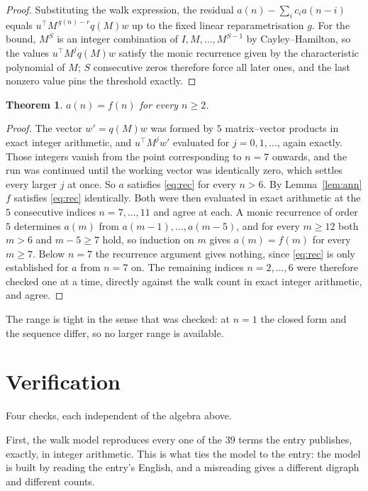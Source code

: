 \documentclass[11pt,a4paper]{article}
\theoremstyle{plain}
\newtheorem{theorem}{Theorem}
\theoremstyle{definition}
\begin{document}
\begin{proof}
Substituting the walk expression, the residual $a(n)-\sum_ic_ia(n-i)$ equals
$u^{\!\top}M^{\,g(n)-r}q(M)w$ up to the fixed linear reparametrisation $g$. For the bound,
$M^{S}$ is an integer combination of $I,M,\dots,M^{S-1}$ by Cayley--Hamilton, so the values
$u^{\!\top}M^{j}q(M)w$ satisfy the monic recurrence given by the characteristic polynomial of
$M$; $S$ consecutive zeros therefore force all later ones, and the last nonzero value pins the
threshold exactly.
\end{proof}

\begin{theorem}
$a(n)=f(n)$ for every $n\ge2$.
\end{theorem}

\begin{proof}
The vector $w'=q(M)w$ was formed by $5$ matrix--vector products in exact integer
arithmetic, and $u^{\!\top}M^{j}w'$ evaluated for $j=0,1,\dots$, again exactly. Those integers
vanish from the point corresponding to $n=7$ onwards, and the run was continued until the
working vector was identically zero, which settles every larger $j$ at once. So $a$ satisfies
\eqref{eq:rec} for every $n>6$. By Lemma~\ref{lem:ann} $f$ satisfies \eqref{eq:rec}
identically. Both were then evaluated in exact arithmetic at the $5$ consecutive indices
$n=7,\dots,11$ and agree at each. A monic recurrence of order $5$
determines $a(m)$ from $a(m-1),\dots,a(m-5)$, and for every $m\ge12$ both
$m>6$ and $m-5\ge7$ hold, so induction on $m$ gives $a(m)=f(m)$ for every
$m\ge7$.
Below $n=7$ the recurrence argument gives nothing, since \eqref{eq:rec} is only
established for $a$ from $n=7$ on. The remaining indices $n=2,\dots,6$ were
therefore checked one at a time, directly against the walk count in exact integer arithmetic,
and agree.
\end{proof}

The range is tight in the sense that was checked: at $n=1$ the closed form and the sequence differ, so no larger range is available.

\section{Verification}

Four checks, each independent of the algebra above.

First, the walk model reproduces every one of the $39$ terms the entry publishes,
exactly, in integer arithmetic. This is what ties the model to the entry: the model is built
by reading the entry's English, and a misreading gives a different digraph and different
counts.
\end{document}
